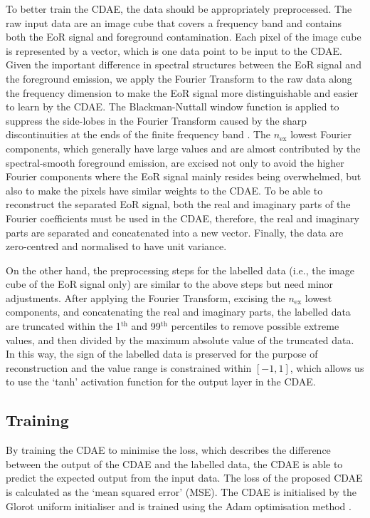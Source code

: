 \documentclass[letters,a4paper,fleqn,usenatbib]{mnras}
\newcommand{\R}[1]{\mathrm{#1}}
\begin{document}
To better train the CDAE, the data should be appropriately preprocessed.
The raw input data are an image cube that covers a frequency band and
contains both the EoR signal and foreground contamination.
Each pixel of the image cube is represented by a vector, which is one
data point to be input to the CDAE.
Given the important difference in spectral structures between the EoR
signal and the foreground emission, we apply the Fourier Transform to
the raw data along the frequency dimension to make the EoR signal more
distinguishable and easier to learn by the CDAE.
The Blackman-Nuttall window function is applied to suppress the side-lobes
in the Fourier Transform caused by the sharp discontinuities at the ends
of the finite frequency band \citep[e.g.,][]{chapman2016}.
The $n_{\R{ex}}$ lowest Fourier components, which generally have large
values and are almost contributed by the spectral-smooth foreground
emission, are excised not only to avoid the higher Fourier components
where the EoR signal mainly resides being overwhelmed, but also to
make the pixels have similar weights to the CDAE.
To be able to reconstruct the separated EoR signal, both the real and
imaginary parts of the Fourier coefficients must be used in the CDAE,
therefore, the real and imaginary parts are separated and concatenated
into a new vector.
Finally, the data are zero-centred and normalised to have unit variance.

On the other hand, the preprocessing steps for the labelled data (i.e.,
the image cube of the EoR signal only) are similar to the above steps
but need minor adjustments.
After applying the Fourier Transform, excising the $n_{\R{ex}}$ lowest
components, and concatenating the real and imaginary parts,
the labelled data are truncated within the 1$^{\R{th}}$ and 99$^{\R{th}}$
percentiles to remove possible extreme values, and then divided by the
maximum absolute value of the truncated data.
In this way, the sign of the labelled data is preserved for the purpose
of reconstruction and the value range is constrained within $[-1, 1]$,
which allows us to use the `tanh' activation function for the output
layer in the CDAE.


\subsection{Training}
\label{sec:training}

By training the CDAE to minimise the loss, which describes the
difference between the output of the CDAE and the labelled data,
the CDAE is able to predict the expected output from the input data.
The loss of the proposed CDAE is calculated as the
`mean squared error' (MSE).
The CDAE is initialised by the Glorot uniform initialiser \citep{glorot2010}
and is trained using the Adam optimisation method \citep{kingma2015}.
\end{document}
